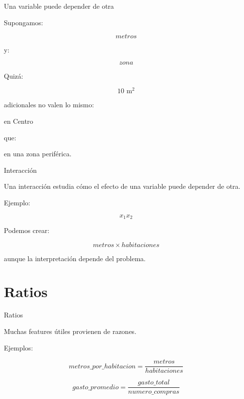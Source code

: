 \documentclass[aspectratio=169,11pt]{beamer}
\begin{document}
\begin{frame}{Una variable puede depender de otra}

Supongamos:

\[
metros
\]

y:

\[
zona
\]

Quizá:

\[
10\text{ m}^2
\]

adicionales no valen lo mismo:

\begin{center}

en Centro
\end{center}

que:

\begin{center}

en una zona periférica.
\end{center}

\end{frame}


\begin{frame}{Interacción}

Una interacción estudia cómo el efecto de una variable puede depender
de otra.

Ejemplo:

\[
x_1x_2
\]

Podemos crear:

\[
metros
\times
habitaciones
\]

aunque la interpretación depende del problema.

\end{frame}

\section{Ratios}

\begin{frame}{Ratios}

Muchas features útiles provienen de razones.

Ejemplos:

\[
metros\_por\_habitacion
=
\frac{
metros
}{
habitaciones
}
\]

\[
gasto\_promedio
=
\frac{
gasto\_total
}{
numero\_compras
}
\]

\end{frame}
\end{document}
